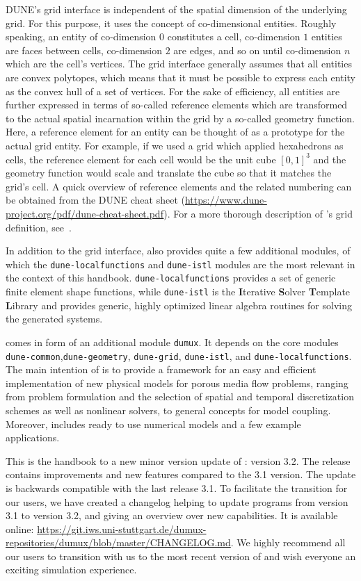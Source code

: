 DUNE's grid interface is independent of the spatial dimension of the
underlying grid. For this purpose, it uses the concept of
co-dimensional entities. Roughly speaking, an entity of co-dimension
$0$ constitutes a cell, co-dimension $1$ entities are faces between
cells, co-dimension $2$ are edges, and so on until co-dimension $n$
which are the cell's vertices.  The \Dune grid interface generally
assumes that all entities are convex polytopes, which means that it
must be possible to express each entity as the convex hull of a set of
vertices. For the sake of efficiency, all entities are further expressed in terms
of so-called reference elements which are transformed to the actual
spatial incarnation within the grid by a so-called geometry
function. Here, a reference element for an
entity can be thought of as a prototype for the actual grid
entity. For example, if we used a grid which applied hexahedrons as cells,
the reference element for each cell would be the unit cube $[0, 1]^3$
and the geometry function would scale and translate the cube so that
it matches the grid's cell. A quick overview of reference elements and the
related numbering can be obtained from the DUNE cheat sheet
(\url{https://www.dune-project.org/pdf/dune-cheat-sheet.pdf}).
For a more thorough description of \Dune's
grid definition, see~\cite{BASTIAN2008}.

In addition to the grid interface, \Dune also provides quite a few
additional modules, of which the \texttt{dune-localfunctions} and
\texttt{dune-istl} modules are the most relevant in the context of
this handbook. \texttt{dune-localfunctions} provides a set of generic
finite element shape functions, while \texttt{dune-istl} is the
\textbf{I}terative \textbf{S}olver \textbf{T}emplate \textbf{L}ibrary
and provides generic, highly optimized linear algebra routines for
solving the generated systems.

\Dumux comes in form of an additional module \texttt{dumux}.
It depends on the \Dune core modules
\texttt{dune-common},\texttt{dune-geometry}, \texttt{dune-grid}, \texttt{dune-istl}, and \texttt{dune-localfunctions}.
The main intention of \Dumux is to provide a framework for an easy and efficient
implementation of new physical models for porous media flow problems,
ranging from problem formulation and the selection of
spatial and temporal discretization schemes as well as nonlinear solvers,
to general concepts for model coupling.
Moreover, \Dumux includes ready to use numerical models and a few example applications.

This is the handbook to a new minor version update of \Dumux: version 3.2.
The release contains improvements and new features compared to the 3.1 version.
The update is  backwards compatible with the last release 3.1.
To facilitate the transition for our users, we have created a changelog
helping to update programs from version 3.1 to version 3.2, and giving an overview over new capabilities.
It is available online:
\url{https://git.iws.uni-stuttgart.de/dumux-repositories/dumux/blob/master/CHANGELOG.md}.
We highly recommend all our users to transition with us to the most recent version of \Dumux
and wish everyone an exciting simulation experience.

